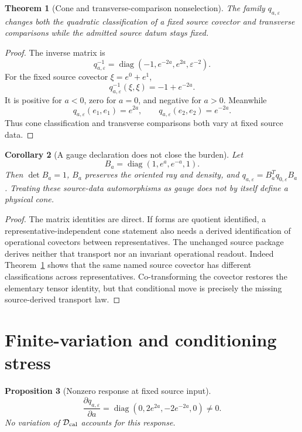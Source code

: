 \documentclass[11pt]{article}
\newtheorem{theorem}{Theorem}
\newtheorem{proposition}[theorem]{Proposition}
\newtheorem{corollary}[theorem]{Corollary}
\newcommand{\diag}{\operatorname{diag}}
\begin{document}
\begin{theorem}[Cone and transverse-comparison nonselection]
\label{thm:cone}
The family \(q_{a,\varepsilon}\) changes both the quadratic classification of
a fixed source covector and transverse comparisons while the admitted source
datum stays fixed.
\end{theorem}
\begin{proof}
The inverse matrix is
\[
 q_{a,\varepsilon}^{-1}
 =\diag\!\left(-1,e^{-2a},e^{2a},\varepsilon^{-2}\right).
\]
For the fixed source covector \(\xi=e^0+e^1\),
\[
 q_{a,\varepsilon}^{-1}(\xi,\xi)=-1+e^{-2a}.
\]
It is positive for \(a<0\), zero for \(a=0\), and negative for \(a>0\).
Meanwhile
\[
 q_{a,\varepsilon}(e_1,e_1)=e^{2a},\qquad
 q_{a,\varepsilon}(e_2,e_2)=e^{-2a}.
\]
Thus cone classification and transverse comparisons both vary at fixed
source data.
\end{proof}

\begin{corollary}[A gauge declaration does not close the burden]
\label{cor:gauge}
Let
\[
 B_a=\diag(1,e^a,e^{-a},1).
\]
Then \(\det B_a=1\), \(B_a\) preserves the oriented ray and density, and
\(q_{a,\varepsilon}=B_a^Tq_{0,\varepsilon}B_a\). Treating these
source-data automorphisms as gauge does not by itself define a physical cone.
\end{corollary}
\begin{proof}
The matrix identities are direct. If forms are quotient identified, a
representative-independent cone statement also needs a derived identification
of operational covectors between representatives. The unchanged source
package derives neither that transport nor an invariant operational
readout. Indeed Theorem~\ref{thm:cone} shows that the same named source
covector has different classifications across representatives. Co-transforming
the covector restores the elementary tensor identity, but that conditional
move is precisely the missing source-derived transport law.
\end{proof}

\section{Finite-variation and conditioning stress}

\begin{proposition}[Nonzero response at fixed source input]
\[
 \frac{\partial q_{a,\varepsilon}}{\partial a}
 =\diag\!\left(0,2e^{2a},-2e^{-2a},0\right)\ne0.
\]
No variation of \(\mathcal D_{\rm cal}\) accounts for this response.
\end{proposition}
\end{document}
